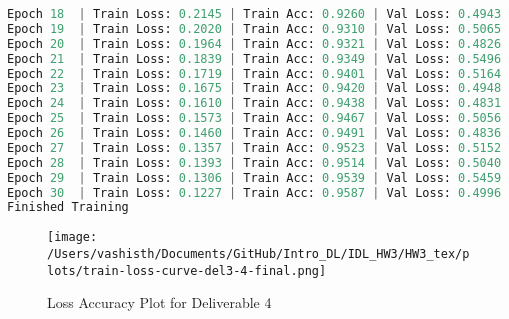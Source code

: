 \begin{solve}
\begin{lstlisting}[language=python, title=Train Logs, basicstyle=\tiny]
Epoch 18  | Train Loss: 0.2145 | Train Acc: 0.9260 | Val Loss: 0.4943 | Val Acc: 0.8491 | Best Val Loss: 0.4827
Epoch 19  | Train Loss: 0.2020 | Train Acc: 0.9310 | Val Loss: 0.5065 | Val Acc: 0.8428 | Best Val Loss: 0.4827
Epoch 20  | Train Loss: 0.1964 | Train Acc: 0.9321 | Val Loss: 0.4826 | Val Acc: 0.8500 | Best Val Loss: 0.4826
Epoch 21  | Train Loss: 0.1839 | Train Acc: 0.9349 | Val Loss: 0.5496 | Val Acc: 0.8346 | Best Val Loss: 0.4826
Epoch 22  | Train Loss: 0.1719 | Train Acc: 0.9401 | Val Loss: 0.5164 | Val Acc: 0.8484 | Best Val Loss: 0.4826
Epoch 23  | Train Loss: 0.1675 | Train Acc: 0.9420 | Val Loss: 0.4948 | Val Acc: 0.8536 | Best Val Loss: 0.4826
Epoch 24  | Train Loss: 0.1610 | Train Acc: 0.9438 | Val Loss: 0.4831 | Val Acc: 0.8538 | Best Val Loss: 0.4826
Epoch 25  | Train Loss: 0.1573 | Train Acc: 0.9467 | Val Loss: 0.5056 | Val Acc: 0.8547 | Best Val Loss: 0.4826
Epoch 26  | Train Loss: 0.1460 | Train Acc: 0.9491 | Val Loss: 0.4836 | Val Acc: 0.8596 | Best Val Loss: 0.4826
Epoch 27  | Train Loss: 0.1357 | Train Acc: 0.9523 | Val Loss: 0.5152 | Val Acc: 0.8461 | Best Val Loss: 0.4826
Epoch 28  | Train Loss: 0.1393 | Train Acc: 0.9514 | Val Loss: 0.5040 | Val Acc: 0.8528 | Best Val Loss: 0.4826
Epoch 29  | Train Loss: 0.1306 | Train Acc: 0.9539 | Val Loss: 0.5459 | Val Acc: 0.8490 | Best Val Loss: 0.4826
Epoch 30  | Train Loss: 0.1227 | Train Acc: 0.9587 | Val Loss: 0.4996 | Val Acc: 0.8570 | Best Val Loss: 0.4826
Finished Training
\end{lstlisting}

\begin{figure}[H]
    \centering
    \texttt{[image: /Users/vashisth/Documents/GitHub/Intro\_DL/IDL\_HW3/HW3\_tex/plots/train-loss-curve-del3-4-final.png]}
    \caption{Loss Accuracy Plot for Deliverable 4}
\end{figure}

\end{solve}
